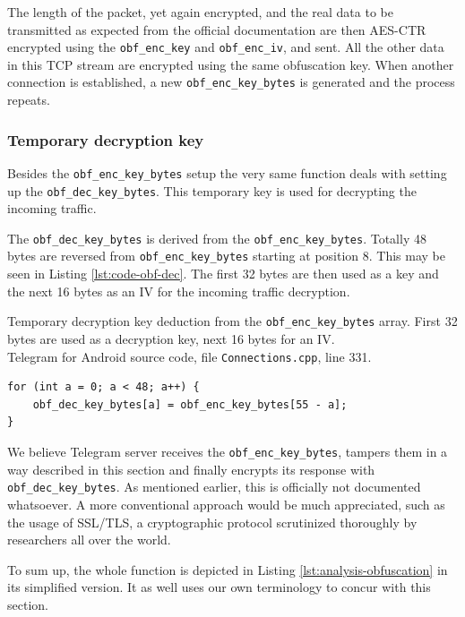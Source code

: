 \documentclass[thesis=M,english]{FITthesis}[2012/10/20]
\begin{document}
The length of the packet, yet again encrypted, and the real data to be transmitted as expected from the official documentation are then AES-CTR encrypted using the \texttt{obf\_enc\_key} and \texttt{obf\_enc\_iv}, and sent. All the other data in this TCP stream are encrypted using the same obfuscation key. When another connection is established, a new \texttt{obf\_enc\_key\_bytes} is generated and the process repeats.

\subsubsection{Temporary decryption key}

Besides the \texttt{obf\_enc\_key\_bytes} setup the very same function deals with setting up the \texttt{obf\_dec\_key\_bytes}. This temporary key is used for decrypting the incoming traffic.

The \texttt{obf\_dec\_key\_bytes} is derived from the \texttt{obf\_enc\_key\_bytes}. Totally 48 bytes are reversed from \texttt{obf\_enc\_key\_bytes} starting at position 8. This may be seen in Listing \ref{lst:code-obf-dec}. The first 32 bytes are then used as a key and the next 16 bytes as an IV for the incoming traffic decryption.

\begin{listing}[htb]
\caption{Temporary decryption key deduction from the \texttt{obf\_enc\_key\_bytes} array. First 32 bytes are used as a decryption key, next 16 bytes for an IV.
\protect \\ Telegram for Android source code, file \texttt{Connections.cpp}, line 331.}
\label{lst:code-obf-dec}
\begin{verbatim}
for (int a = 0; a < 48; a++) {
    obf_dec_key_bytes[a] = obf_enc_key_bytes[55 - a];
}
\end{verbatim}
\end{listing}


We believe Telegram server receives the \texttt{obf\_enc\_key\_bytes}, tampers them in a way described in this section and finally encrypts its response with \texttt{obf\_dec\_key\_bytes}. As mentioned earlier, this is officially not documented whatsoever. A more conventional approach would be much appreciated,  such as the usage of SSL/TLS, a cryptographic protocol scrutinized thoroughly by researchers all over the world.

To sum up, the whole function is depicted in Listing \ref{lst:analysis-obfuscation} in its simplified version. It as well uses our own terminology to concur with this section.
\end{document}
